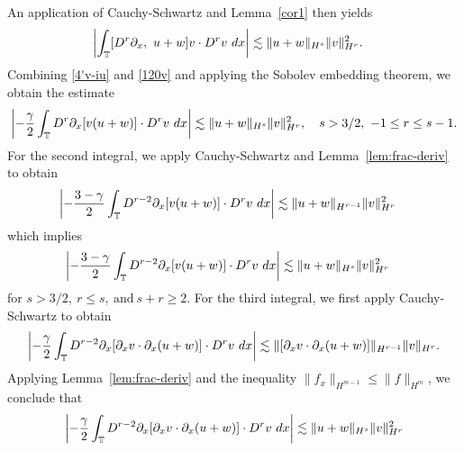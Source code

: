 An application of 
Cauchy-Schwartz and Lemma~\ref{cor1} then yields 
%
%
\begin{equation}
\begin{split}
\left | \int_{\mathbb{T}} [D^r \partial_x, \ u+w] v
\cdot D^r v \ dx \right |
& \lesssim \|u+w\|_{H^s} 
\|v\|_{H^r}^2.
\label{120v}
\end{split}
\end{equation}
%
%
Combining \eqref{4'v-iu} and \eqref{120v} and applying the Sobolev embedding 
theorem, we obtain the estimate
%
%
\begin{equation}
\begin{split}
\left |  -\frac{\gamma}{2} \int_{\mathbb{T}} D^r \partial_x [v(u+w)] \cdot
D^r v \ dx \right |
\lesssim \|u+w\|_{H^s} \|v\|_{H^r}^2, \quad s > 3/2, \ -1 \le r \le s-1.
\label{20v}
\end{split}
\end{equation}
%
%
%
%
%
%
%
For the second integral, we apply Cauchy-Schwartz and Lemma~\ref{lem:frac-deriv} to obtain
%
%
%
\begin{equation*}
\begin{split}
\left | - \frac{3-\gamma}{2} \int_{\mathbb{T}}  D^{r -2}
\partial_x[v(u+w)] \cdot
D^r v \ dx  \right |
& \lesssim \|u+w\|_{H^{r -1}} \|v\|_{H^r}^2
\end{split}
\end{equation*}
%
%
which implies
\begin{equation}
\begin{split}
\left | - \frac{3-\gamma}{2} \int_{\mathbb{T}}  D^{r -2}
\partial_x[v(u+w)] \cdot
D^r v \ dx  \right |
& \lesssim \|u+w\|_{H^{s}} \|v\|_{H^r}^2
\label{3vj}
\end{split}
\end{equation}
%
for $s > 3/2, \ r \le s, \ \text{and} \ s + r \ge 2$.
%
For the third integral, we first apply
Cauchy-Schwartz to obtain
%
%
\begin{equation*}
\begin{split}
\left | - \frac{\gamma}{2} \int_{\mathbb{T}} D^{r 
-2} \partial_x [ \partial_x v
\cdot \partial_x (u+w)]\cdot D^r v \ dx \right | 
\lesssim 
\|[\partial_x v \cdot \partial_x (u+w)] \|_{H^{r -1}}
\|v\|_{H^r}.
\end{split}
\end{equation*}
%
%
Applying Lemma~\ref{lem:frac-deriv} and the inequality $\| f_{x}
\|_{H^{m-1}} \le \| f \|_{H^{m}}$,  we conclude that
%
\begin{equation}
\begin{split}
\left | - \frac{\gamma}{2} \int_{\mathbb{T}} D^{r 
-2} \partial_x [ \partial_x v
\cdot \partial_x (u+w)]\cdot D^r v \ dx \right | 
\lesssim \|u+w \|_{H^{s}}
\|v\|_{H^r}^2
\label{3'v-iu}
\end{split}
\end{equation}
